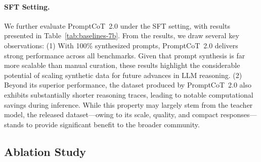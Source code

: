 \paragraph{SFT Setting.}
We further evaluate PromptCoT~2.0 under the SFT setting, with results presented in Table~\ref{tab:baselines-7b}. From the results, we draw several key observations: (1) With 100\% synthesized prompts, PromptCoT~2.0 delivers strong performance across all benchmarks. Given that prompt synthesis is far more scalable than manual curation, these results highlight the considerable potential of scaling synthetic data for future advances in LLM reasoning. (2) Beyond its superior performance, the dataset produced by PromptCoT~2.0 also exhibits substantially shorter reasoning traces, leading to notable computational savings during inference. While this property may largely stem from the teacher model, the released dataset—owing to its scale, quality, and compact responses—stands to provide significant benefit to the broader community.







\begin{table}[t]
\centering
{}
\caption{Ablation results under the SFT setting using models with \textbf{7B} parameters. Bold numbers indicate the highest performance.}
\label{tab:ablation}
\end{table}


\subsection{Ablation Study}

